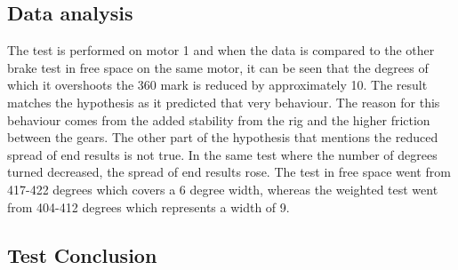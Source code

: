 \subsection{Data analysis}
The test is performed on motor 1 and when the data is compared to the other brake test in free space on the same motor, it can be seen that the degrees of which it overshoots the 360 mark is reduced by approximately 10\textdegree. The result matches the hypothesis as it predicted that very behaviour. The reason for this behaviour comes from the added stability from the rig and the higher friction between the gears. The other part of the hypothesis that mentions the reduced spread of end results is not true. In the same test where the number of degrees turned decreased, the spread of end results rose. The test in free space went from 417-422 degrees which covers a 6 degree width, whereas the weighted test went from 404-412 degrees which represents a width of 9.

\subsection{Test Conclusion}

